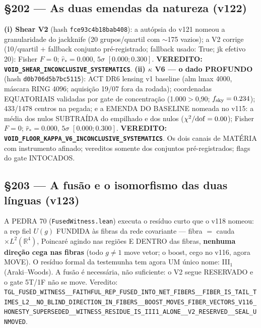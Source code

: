 \documentclass[11pt]{article}
\theoremstyle{definition}\newtheorem{deriv}{Derivação}
\begin{document}
\subsection*{\S202 --- As duas emendas da natureza (v122)}\textbf{(i) Shear V2} (hash \texttt{fce93c4b18bab408}): a autópsia do v121 nomeou a granularidade do jackknife (20 grupos/quartil com $\sim$175 vazios); a V2 corrige (10/quartil $+$ fallback conjunto pré-registrado; fallback usado: True; jk efetivo 20): Fisher $F=0$; $\hat r_*=0.000$, $5\sigma$ $[0.000;0.300]$. \textbf{VEREDITO: \texttt{VOID\_SHEAR\_INCONCLUSIVE\_SYSTEMATICS}}. \textbf{(ii) $\kappa$ V6 --- o dado PROFUNDO} (hash \texttt{d0b706d5b7bc5115}): ACT DR6 lensing v1 baseline (alm lmax 4000, máscara RING 4096; aquisição 19/07 fora da rodada); coordenadas EQUATORIAIS validadas por gate de concentração (1.000$>$0,90; $f_{\rm sky}=0.234$); 433/1478 centros na pegada; e a EMENDA DO BASELINE nomeada no v115: a média dos nulos SUBTRAÍDA do empilhado e dos nulos ($\chi^2/{\rm dof}=0.00$); Fisher $F=0$; $\hat r_*=0.000$, $5\sigma$ $[0.000;0.300]$. \textbf{VEREDITO: \texttt{VOID\_FLOOR\_KAPPA\_V6\_INCONCLUSIVE\_SYSTEMATICS}}. Os dois canais de MATÉRIA com instrumento afinado; vereditos somente dos conjuntos pré-registrados; flags do gate INTOCADOS.

\subsection*{\S203 --- A fusão e o isomorfismo das duas línguas (v123)}A PEDRA 70 (\texttt{FusedWitness.lean}) executa o resíduo curto que o v118 nomeou: a rep fiel $U(g)$ FUNDIDA às fibras da rede covariante --- fibra $=$ cauda $\times L^2(\mathbb{R}^4)$, Poincaré agindo nas regiões E DENTRO das fibras, \textbf{nenhuma direção cega nas fibras} (todo $g\neq1$ move vetor; o boost, cego no v116, agora MOVE). O resíduo formal da testemunha tem agora UM único nome: III$_1$ (Araki--Woods). A fusão é necessária, não suficiente: o V2 segue RESERVADO e o gate 5T/1F não se move. Veredito: \texttt{TGL\_FUSED\_WITNESS\_\_FAITHFUL\_REP\_FUSED\_INTO\_NET\_FIBERS\_\_FIBER\_IS\_TAIL\_TIMES\_L2\_\_NO\_BLIND\_DIRECTION\_IN\_FIBERS\_\_BOOST\_MOVES\_FIBER\_VECTORS\_V116\_HONESTY\_SUPERSEDED\_\_WITNESS\_RESIDUE\_IS\_III1\_ALONE\_\_V2\_RESERVED\_\_SEAL\_UNMOVED}.
\end{document}

